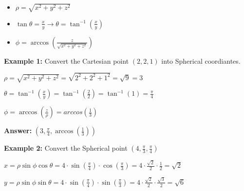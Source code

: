 \documentclass[10pt]{article}                               %
\begin{document}
\begin{defaultbox}
\begin{adjustwidth}{2em}{0pt}
\begin{adjustwidth}{2em}{0pt}
                \begin{itemize}
                    \item \( \rho = \sqrt{x^2 + y^2 + z^2} \)
                    \item \( \tan\theta = \frac{x}{y}  \rightarrow  \theta = \tan^{-1}\left(\frac{x}{y}\right) \)
                    \item \( \phi = \arccos\left(\frac{z}{\sqrt{x^2 + y^2 + z^2}}\right) \)
                \end{itemize}

                \begin{examplebox}
            
                    \textbf{Example 1:} Convert the Cartesian point \( \left(2,2,1\right) \) into Spherical coordiantes.
                    \vspace{0.5em}
    
                    \begin{adjustwidth}{2em}{0pt}
    
                        \( \rho = \sqrt{x^2 + y^2 + z^2} = \sqrt{2^2 + 2^2 + 1^2} = \sqrt{9} = 3 \)
    
                        \( \theta = \tan^{-1}\left(\frac{x}{y}\right) = \tan^{-1}\left(\frac{2}{2}\right) = \tan^{-1}(1) = \frac{\pi}{4} \)
    
                        \( \phi = \arccos\left(\frac{z}{\rho}\right) = arccos\left(\frac{1}{3}\right) \)
    
                        \textbf{Answer:} \( \left(3, \frac{\pi}{4}, \arccos\left(\frac{1}{3}\right)\right) \)
    
                    \end{adjustwidth}
    
                    \vspace{1em}
    
                    \textbf{Example 2:} Convert the Spherical point \( \left(4, \frac{\pi}{3}, \frac{\pi}{4}\right) \)
                    \vspace{0.5em}
    
                    \begin{adjustwidth}{2em}{0pt}
    
                        \( x = \rho\sin\phi\cos\theta = 4 \cdot \sin\left(\frac{\pi}{4}\right) \cdot \cos\left(\frac{\pi}{3}\right) = 4 \cdot \frac{\sqrt{2}}{2} \cdot \frac{1}{2} = \sqrt{2} \)
    
                        \( y = \rho\sin\phi\sin\theta = 4 \cdot \sin\left(\frac{\pi}{4}\right) \cdot \sin\left(\frac{\pi}{3}\right) = 4 \cdot \frac{\sqrt{2}}{2} \cdot \frac{\sqrt{3}}{2} = \sqrt{6} \)
    

\end{adjustwidth}
\end{examplebox}
\end{adjustwidth}
\end{adjustwidth}
\end{defaultbox}
\end{document}
